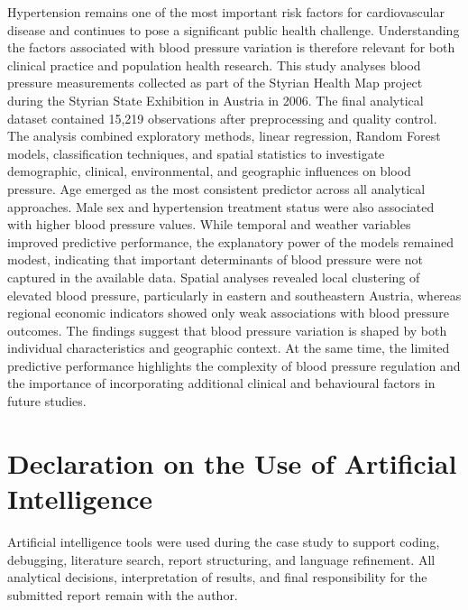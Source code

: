 \documentclass[12pt,a4paper]{article}
\begin{document}
Hypertension remains one of the most important risk factors for cardiovascular disease and continues to pose a significant public health challenge. Understanding the factors associated with blood pressure variation is therefore relevant for both clinical practice and population health research.
This study analyses blood pressure measurements collected as part of the Styrian Health Map project during the Styrian State Exhibition in Austria in 2006. The final analytical dataset contained 15,219 observations after preprocessing and quality control. The analysis combined exploratory methods, linear regression, Random Forest models, classification techniques, and spatial statistics to investigate demographic, clinical, environmental, and geographic influences on blood pressure.
Age emerged as the most consistent predictor across all analytical approaches. Male sex and hypertension treatment status were also associated with higher blood pressure values. While temporal and weather variables improved predictive performance, the explanatory power of the models remained modest, indicating that important determinants of blood pressure were not captured in the available data. Spatial analyses revealed local clustering of elevated blood pressure, particularly in eastern and southeastern Austria, whereas regional economic indicators showed only weak associations with blood pressure outcomes.
The findings suggest that blood pressure variation is shaped by both individual characteristics and geographic context. At the same time, the limited predictive performance highlights the complexity of blood pressure regulation and the importance of incorporating additional clinical and behavioural factors in future studies.


\section*{Declaration on the Use of Artificial Intelligence}

Artificial intelligence tools were used during the case study to support coding, debugging, literature search, report structuring, and language refinement. All analytical decisions, interpretation of results, and final responsibility for the submitted report remain with the author.

\end{document}
